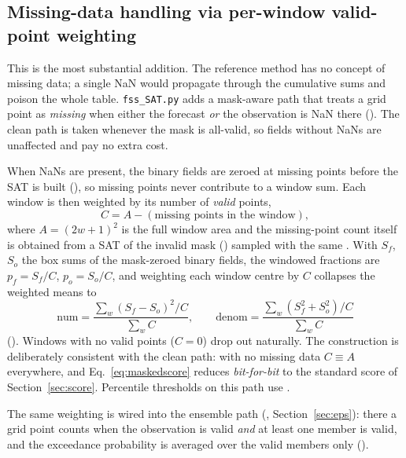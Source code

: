 \subsection{Missing-data handling via per-window valid-point weighting}
\label{sec:nan}

This is the most substantial addition. The reference method has no concept of
missing data; a single NaN would propagate through the cumulative sums and
poison the whole table. \texttt{fss\_SAT.py} adds a mask-aware path that treats
a grid point as \emph{missing} when either the forecast \emph{or} the
observation is NaN there (). The clean path is taken
whenever the mask is all-valid, so fields without NaNs are unaffected and pay no
extra cost.

When NaNs are present, the binary fields are zeroed at missing points before the
SAT is built (), so missing points never
contribute to a window sum. Each window is then weighted by its number of
\emph{valid} points,
%
\begin{equation}
  C = A - (\text{missing points in the window}),
  \label{eq:validcount}
\end{equation}
%
where $A=(2w+1)^2$ is the full window area and the missing-point count itself is
obtained from a SAT of the invalid mask () sampled with
the same . With $S_f$, $S_o$ the box sums of the
mask-zeroed binary fields, the windowed fractions are $p_f=S_f/C$, $p_o=S_o/C$,
and weighting each window centre by $C$ collapses the weighted means to
%
\begin{equation}
  \mathrm{num} = \frac{\sum_w (S_f-S_o)^2 / C}{\sum_w C},
  \qquad
  \mathrm{denom} = \frac{\sum_w (S_f^2+S_o^2) / C}{\sum_w C}
  \label{eq:maskedscore}
\end{equation}
%
(). Windows with no valid points ($C=0$) drop out
naturally. The construction is deliberately consistent with the clean path: with
no missing data $C\equiv A$ everywhere, and Eq.~\eqref{eq:maskedscore} reduces
\emph{bit-for-bit} to the standard score of Section~\ref{sec:score}. Percentile
thresholds on this path use .

The same weighting is wired into the ensemble path (,
Section~\ref{sec:eps}): there a grid point counts when the observation is valid
\emph{and} at least one member is valid, and the exceedance probability is
averaged over the valid members only ().

